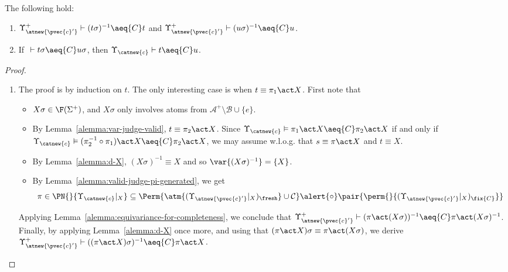 \begin{lemma}\label{alemma:inversion-properties}
The following hold:
\begin{enumerate}
\item \label{alemma:substitution-inverse-fixed-point}
    $\Upsilon^+_{\atnew{\pvec{c}'}}\vdash (t\sigma)^{-1} \aeq{C} t$ and $\Upsilon^+_{\atnew{\pvec{c}'}}\vdash (u\sigma)^{-1} \aeq{C} u$.
\item \label{alemma:ground-derivation-implies-derivation}
    If $~\vdash t\sigma \aeq{C} u\sigma$, then $\Upsilon_{\catnew{c}} \vdash t \aeq{C} u$.
\end{enumerate}
\end{lemma}

\begin{proof}
    \begin{enumerate}
        \item The proof is by induction on $t$. The only interesting case is when $t\equiv \pi_1\act X$. First note that

\begin{itemize}
    \item $X\sigma \in \F(\Sigma^+)$, and $X\sigma$ only involves atoms from $\mathcal{A}^+ \setminus \mathcal{B} \cup \{e\}$.

    \item By Lemma~\ref{alemma:var-judge-valid}, $t \equiv \pi_2 \act X$. Since $\Upsilon_{\catnew{c}} \vDash \pi_1 \act X \aeq{C} \pi_2 \act X$ if and only if $\Upsilon_{\catnew{c}} \vDash (\pi_2^{-1} \circ \pi_1) \act X \aeq{C} \pi_2 \act X$, we may assume w.l.o.g. that $s \equiv \pi \act X$ and $t \equiv X$.

    \item By Lemma~\ref{alemma:d-X}, $(X\sigma)^{-1} \equiv X$ and so $\var{(X\sigma)^{-1}} = \{X\}$.

    \item By Lemma~\ref{alemma:valid-judge-pi-generated}, we get
    \[
        \pi \in\PN{}{\Upsilon_{\catnew{c}}|_X} \subseteq \Perm{\atm{(\Upsilon_{\atnew{\pvec{c}'}}|_X)_{\fresh}}\cup {\cal C}}\alert{\circ}\pair{\perm{}{(\Upsilon_{\atnew{\pvec{c}'}}|_X)_{\fix{C}}}}
    \]
\end{itemize}

Applying Lemma~\ref{alemma:equivariance-for-completeness}, we conclude that $\Upsilon^+_{\atnew{\pvec{c}'}} \vdash (\pi \act (X\sigma))^{-1} \aeq{C} \pi \act (X\sigma)^{-1}$. Finally, by applying Lemma~\ref{alemma:d-X} once more, and using that $(\pi\act X)\sigma \equiv \pi\act(X\sigma)$, we derive $\Upsilon^+_{\atnew{\pvec{c}'}} \vdash ((\pi \act X)\sigma)^{-1} \aeq{C} \pi \act X$.


\end{enumerate}
\end{proof}
